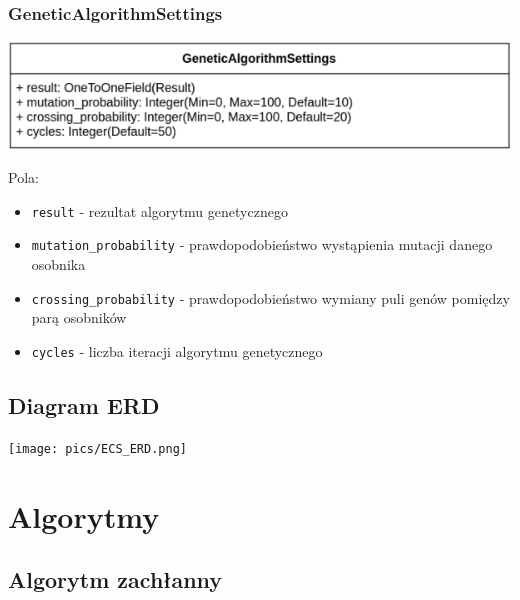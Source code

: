 \documentclass[pdflatex,11pt]{../aghdoc_version2}
\newcommand{\code}[1]{\texttt{#1}}
\begin{document}
\clearpage
\subsection{GeneticAlgorithmSettings}
\begin{center}
\centerline{\includegraphics[scale=0.85]{pics/GeneticAlgorithmSettings.png}}
\end{center}
Pola:
\begin{itemize}
\item \code{result} - rezultat algorytmu genetycznego
\item \code{mutation\_probability} - prawdopodobieństwo wystąpienia mutacji danego osobnika
\item \code{crossing\_probability} - prawdopodobieństwo wymiany puli genów pomiędzy parą
osobników
\item \code{cycles} - liczba iteracji algorytmu genetycznego
\end{itemize}

\clearpage
\section{Diagram ERD}
\begin{center}
\centerline{\texttt{[image: pics/ECS\_ERD.png]}}
\end{center}

\chapter{Algorytmy}
\section{Algorytm zachłanny}
\end{document}
